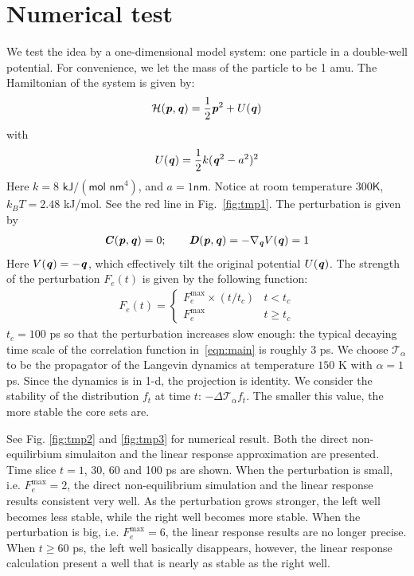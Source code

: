 \documentclass[aip,jcp,a4paper,reprint,onecolumn]{revtex4-1}
\newcommand{\vect}[1]{\textbf{\textit{#1}}}
\newcommand{\mh}{\mathcal H}
\newcommand{\mt}{\mathcal T}
\begin{document}
\section{Numerical test}

We test the idea by a one-dimensional model system: one particle in a
double-well potential. For convenience, we let the mass of the
particle to be 1 \textsf{amu}. The Hamiltonian of the system is given
by:
\begin{align}
  \mh (\vect p, \vect q) = \frac 12 \vect p^2 + U(\vect q) 
\end{align}
with
\begin{align}
  U(\vect q) = \frac12 k (\vect q^2 - a^2)^2
\end{align}
Here $k = 8$ $\textsf{kJ} / (\textsf{mol nm}^4)$, and $ a = 1 \textsf{nm}$.
Notice at room temperature $300 \textsf{K}$, $k_BT = 2.48$ \textsf{kJ/mol}.
See the red line in Fig.~\ref{fig:tmp1}.
The perturbation is given by
\begin{align}
  \vect C(\vect p, \vect q) = 0; \qquad
  \vect D(\vect p, \vect q) = -\nabla_{\vect q} V(\vect q) = 1
\end{align}
Here $V(\vect q) = -\vect q$, which effectively tilt the original
potential $U(\vect q)$. The strength of the perturbation $F_e(t)$ is given
by the following function:
\begin{align}
  F_e(t) = 
  \begin{cases}
    F_e^{\textrm{max}}\times (t / t_c) & t < t_c \\
    F_e^{\textrm{max}} & t \geq t_c
  \end{cases}
\end{align}
$t_c = 100$ \textsf{ps} so that the perturbation increases slow
enough: the typical decaying time scale of the correlation function
in~\eqref{eqn:main} is roughly 3 \textsf{ps}.  We choose $\mt_\alpha$
to be the propagator of the Langevin dynamics at temperature $150$
\textsf{K} with $\alpha = 1$ \textsf{ps}.  Since the dynamics is in
1-d, the projection is identity.  We consider the stability of the
distribution $f_t$ at time $t$: $-\Delta\mt_\alpha f_t$. The smaller
this value, the more stable the core sets are.

See Fig. \ref{fig:tmp2} and \ref{fig:tmp3} for numerical result.  Both
the direct non-equilirbium simulaiton and the linear response
approximation are presented. Time slice $t = 1$, 30, 60 and 100
\textsf{ps} are shown.  When the perturbation is small,
i.e. $F_e^{\textrm{max}} = 2$, the direct non-equilibrium simulation
and the linear response results consistent very well. As the
perturbation grows stronger, the left well becomes less stable, while
the right well becomes more stable.  When the perturbation is big,
i.e. $F_e^{\textrm{max}} = 6$, the linear response results are no
longer precise. When $t\geq 60$ \textsf{ps}, the left well basically
disappears, however, the linear response calculation present a well
that is nearly as stable as the right well.
\end{document}
